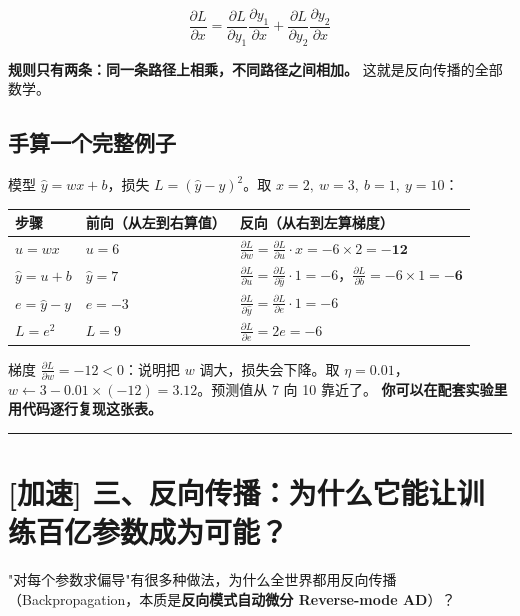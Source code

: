 \[
\frac{\partial L}{\partial x} = \frac{\partial L}{\partial y_1}\frac{\partial y_1}{\partial x} + \frac{\partial L}{\partial y_2}\frac{\partial y_2}{\partial x}
\]

\textbf{规则只有两条：同一条路径上相乘，不同路径之间相加。} 这就是反向传播的全部数学。

\subsection{手算一个完整例子}

模型 $\hat{y} = w x + b$，损失 $L = (\hat{y} - y)^2$。取 $x = 2, \ w = 3, \ b = 1, \ y = 10$：

\begin{center}
\small
\begin{tabularx}{\textwidth}{p{3cm} p{4.5cm} X}
\toprule
\textbf{步骤} & \textbf{前向（从左到右算值）} & \textbf{反向（从右到左算梯度）} \\
\midrule
$u = w x$ & $u = 6$ & $\frac{\partial L}{\partial w} = \frac{\partial L}{\partial u} \cdot x = -6 \times 2 = \mathbf{-12}$ \\
$\hat{y} = u + b$ & $\hat{y} = 7$ & $\frac{\partial L}{\partial u} = \frac{\partial L}{\partial \hat{y}} \cdot 1 = -6$，$\frac{\partial L}{\partial b} = -6 \times 1 = \mathbf{-6}$ \\
$e = \hat{y} - y$ & $e = -3$ & $\frac{\partial L}{\partial \hat{y}} = \frac{\partial L}{\partial e} \cdot 1 = -6$ \\
$L = e^2$ & $L = 9$ & $\frac{\partial L}{\partial e} = 2e = -6$ \\
\bottomrule
\end{tabularx}
\end{center}

梯度 $\frac{\partial L}{\partial w} = -12 < 0$：说明把 $w$ 调大，损失会下降。取 $\eta = 0.01$，$w \leftarrow 3 - 0.01 \times (-12) = 3.12$。预测值从 7 向 10 靠近了。
\textbf{你可以在配套实验里用代码逐行复现这张表。}

\vspace{0.8em}\hrule\vspace{0.8em}

\section{[加速] 三、反向传播：为什么它能让训练百亿参数成为可能？}

"对每个参数求偏导"有很多种做法，为什么全世界都用反向传播（Backpropagation，本质是\textbf{反向模式自动微分 Reverse-mode AD}）？

